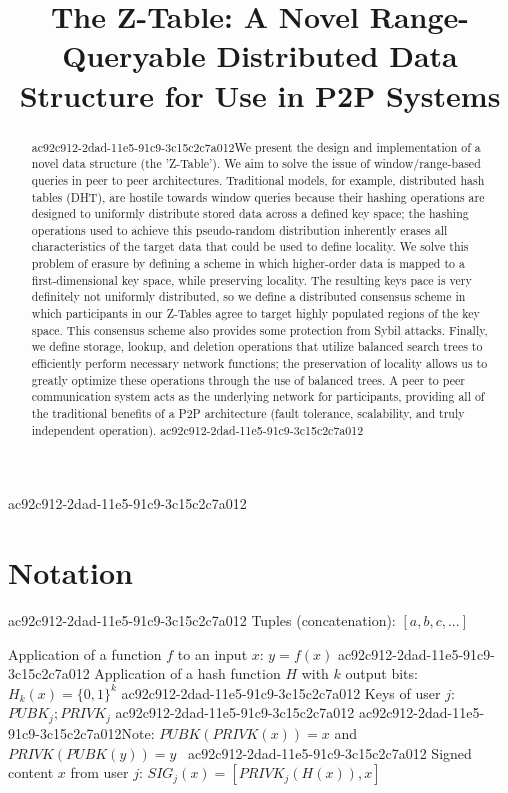 \documentclass[12pt]{article}
\title{The Z-Table: A Novel Range-Queryable Distributed Data Structure for Use in P2P Systems}
\begin{document}
ac92c912-2dad-11e5-91c9-3c15c2c7a012\maketitle

\begin{abstract}
ac92c912-2dad-11e5-91c9-3c15c2c7a012We present the design and implementation of a novel data structure (the 'Z-Table'). We aim to solve the issue of window/range-based queries in peer to peer architectures. Traditional models, for example,  distributed hash tables (DHT), are hostile towards window queries because their hashing operations are designed to uniformly distribute stored data across a defined key space; the hashing operations used to achieve this pseudo-random distribution inherently erases all characteristics of the target data that could be used to define locality. We solve this problem of erasure by defining a scheme in which higher-order data is mapped to a first-dimensional key space, while preserving locality. The resulting keys pace is very definitely not uniformly distributed, so we define a distributed consensus scheme in which participants in our Z-Tables agree to target highly populated regions of the key space. This consensus scheme also provides some protection from Sybil attacks. Finally, we define storage, lookup, and deletion operations that utilize balanced search trees to efficiently perform necessary network functions; the preservation of locality allows us to greatly optimize these operations through the use of balanced trees. A peer to peer communication system acts as the underlying network for participants, providing all of the traditional benefits of a P2P architecture (fault tolerance, scalability, and truly independent operation).
ac92c912-2dad-11e5-91c9-3c15c2c7a012\end{abstract}

\section{Notation}
ac92c912-2dad-11e5-91c9-3c15c2c7a012
Tuples (concatenation): $[a,b,c,...]$

Application of a function $f$ to an input $x$: $y=f(x)$
ac92c912-2dad-11e5-91c9-3c15c2c7a012
Application of a hash function $H$ with $k$ output bits: $H_{k}(x) = \{0,1\}^k$
ac92c912-2dad-11e5-91c9-3c15c2c7a012
Keys of user $j$: $ PUBK_j; PRIVK_j $
ac92c912-2dad-11e5-91c9-3c15c2c7a012
ac92c912-2dad-11e5-91c9-3c15c2c7a012Note: $PUBK(PRIVK(x)) = x$ and $PRIVK(PUBK(y)) = y$~
ac92c912-2dad-11e5-91c9-3c15c2c7a012
Signed content $x$ from user $j$: $SIG_j(x) = \left[ PRIVK_j( H(x) ), x \right]$
\end{document}
